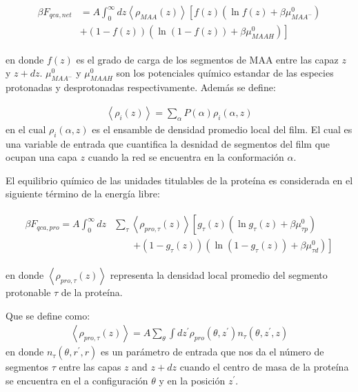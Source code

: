\begin{align}
	\begin{aligned}
		\beta F_{qca,net} &= A\int_0^\infty dz \left<\rho_{MAA}(z)\right> \left[f(z)(\ln f(z)+ \beta\mu^0_{MAA^-})\right.\\
		&\left.+(1-f(z))(\ln (1-f(z))+\beta\mu^0_{MAAH})\right]    
	\end{aligned}
\end{align} 

\noindent en donde $f(z)$ es el grado de carga de los segmentos de MAA entre las capaz $z$ y $z + dz$. 
$\mu^0_{MAA^-}$ y $\mu^0_{MAAH}$ son los potenciales qu\'imico estandar  de las especies protonadas y desprotonadas respectivamente.
Adem\'as se define:

\begin{align}
	\left< \rho_i(z)\right> = \sum_\alpha{P(\alpha)\rho_i(\alpha,z)}
\end{align}
\noindent en el cual $\rho_i(\alpha,z)$  es el ensamble de densidad  promedio local del film. El cual es una variable de entrada que cuantifica la desnidad de segmentos del film que  ocupan una capa $z$ cuando la red se encuentra en la conformaci\'on $\alpha$.


El equilibrio qu\'imico de las unidades titulables de la prote\'ina es considerada en el siguiente t\'ermino de la energ\'ia libre:

\begin{align}
	\begin{aligned}
		\beta F_{qca,pro} = A\int_0^\infty dz& \sum_\tau \left<\rho_{pro,\tau}(z)\right> \left[g_\tau(z)(\ln g_\tau(z)+ \beta\mu^0_{\tau p})\right.\\
		&\qquad\left.+(1-g_\tau(z))(\ln (1-g_\tau(z))+\beta\mu^0_{\tau d})\right]   
	\end{aligned}
\end{align} 

\noindent en donde $\left<\rho_{pro,\tau}(z)\right>$ representa la densidad local promedio del segmento protonable $\tau$ de la prote\'ina.

Que se define como:
\begin{align}
	\left<\rho_{pro,\tau}(z)\right> = A\sum_\theta \int dz^\prime  \rho_{pro}(\theta,z^\prime)n_\tau(\theta,z^\prime, z)
	\label{eq:segments_pro_si}
\end{align}
\noindent en donde $n_\tau(\theta,r^\prime, r)$ es un par\'ametro de entrada que nos da el n\'umero de segmentos $\tau$ entre las capas $z$ and $z+ dz$ cuando el centro de masa de la prote\'ina se encuentra en el a configuraci\'on $\theta$ y en la posici\'on $z^\prime$.

